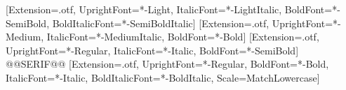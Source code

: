 
\usepackage{fontspec}
\setmainfont{Montserrat}[Extension=.otf, UprightFont=*-Light,
  ItalicFont=*-LightItalic, BoldFont=*-SemiBold, BoldItalicFont=*-SemiBoldItalic]
\newfontfamily{}[Extension=.otf, UprightFont=*-Medium,
  ItalicFont=*-MediumItalic, BoldFont=*-Bold]
\newfontfamily{}[Extension=.otf, UprightFont=*-Regular,
  ItalicFont=*-Italic, BoldFont=*-SemiBold]
@@SERIF@@
\setmonofont{RobotoMono}[Extension=.otf, UprightFont=*-Regular, BoldFont=*-Bold,
  ItalicFont=*-Italic, BoldItalicFont=*-BoldItalic, Scale=MatchLowercase]

\usepackage{xcolor}
\AtBeginDocument{\color{abminavy}}


